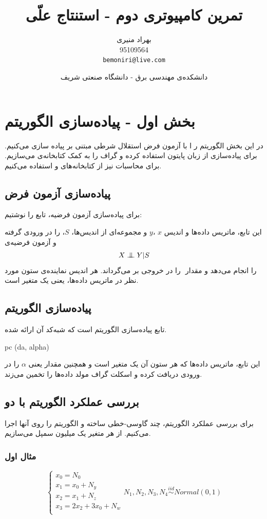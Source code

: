 \documentclass{article}
\title{تمرین کامپیوتری دوم - استنتاج علّی}
\author{بهراد منیری\\95109564\\ \texttt{bemoniri@live.com}}
\date{دانشکده‌ی مهندسی برق - دانشگاه صنعتی شریف}
\begin{document}
\maketitle
\section{بخش 
اول  - پیاده‌سازی الگوریتم 
}
در این بخش الگوریتم
ر ا با آزمون فرض استقلال شرطی مبتنی بر 
پیاده سازی می‌کنیم. برای پیاده‌سازی از زبان پایتون استفاده کرده و گراف را به کمک کتابخانه‌ی 
می‌سازیم. برای محاسبات نیز از کتابخانه‌های 
و
استفاده می‌کنیم.
\subsection{پیاده‌سازی آزمون فرض}
برای پیاده‌سازی آزمون فرضیه،  تابع 
را نوشتیم:


این تابع، ماتریس داده‌ها و اندیس $x$ ،$y$  و مجموعه‌ای از اندیس‌ها، $S$، را در ورودی گرفته و آزمون فرضیه‌ی
$$X\bigCI Y | S$$
را انجام می‌دهد و مقدار ‌
را در خروجی بر می‌گرداند. هر اندیس نماینده‌ی ستون مورد نظر در ماتریس داده‌ها، یعنی یک متغیر است.
\subsection{پیاده‌سازی الگوریتم }
تابع
پیاده‌سازی الگوریتم 
است که شبه‌کد آن ارائه شده.
\begin{latin}
pc (da, alpha)
\end{latin}
این تابع، ماتریس داده‌ها که هر ستون آن یک متغیر است و همچنین مقدار 
یعنی
$\alpha$
را در ورودی دریافت کرده و اسکلت گراف مولد داده‌ها را تخمین می‌زند.
\subsection{
	بررسی عملکرد الگوریتم با دو 
}
\label{toy}
برای بررسی عملکرد الگوریتم، چند
گاوسی-خطی ساخته و الگوریتم را روی آنها اجرا می‌کنیم. از هر متغیر یک میلیون سمپل می‌سازیم.
\subsubsection{مثال اول}
\begin{equation}
\begin{cases}
x_0 = N_0\\
x_1 = x_0 + N_y\\
x_2 = x_1 + N_z\\
x_3 = 2x_2 + 3x_0 +  N_w\\
\end{cases}
N_1, N_2, N_3, N_4 \stackrel{iid}{\sim} Normal(0,1)
\end{equation}
\end{document}
